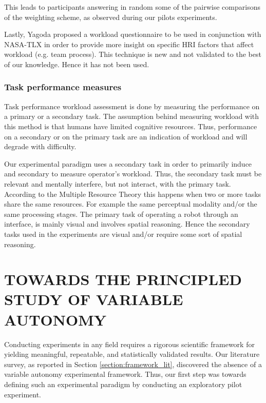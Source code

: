 \documentclass[a4paper,12pt,oneside,openright]{bhamthesis}
\begin{document}
This leads to participants answering in random some of the pairwise comparisons of the weighting scheme, as observed during our pilots experiments.

Lastly, Yagoda \citep{Yagoda2010} proposed a workload questionnaire to be used in conjunction with NASA-TLX in order to provide more insight on specific HRI factors that affect workload (e.g. team process). This technique is new and not validated to the best of our knowledge. Hence it has not been used. 

\subsection{Task performance measures}
Task performance workload assessment is done by measuring the performance on a primary or a secondary task. The assumption behind measuring workload with this method is that humans have limited cognitive resources. Thus, performance on a secondary or on the primary task are an indication of workload and will degrade with difficulty.

Our experimental paradigm uses a secondary task in order to primarily induce and secondary to measure operator's workload. Thus, the secondary task must be relevant and mentally interfere, but not interact, with the primary task. According to the Multiple Resource Theory \citep{Wickens2008,Wickens2002} this happens when two or more tasks share the same resources. For example the same perceptual modality and/or the same processing stages. The primary task of operating a robot through an interface, is mainly visual and involves spatial reasoning. Hence the secondary tasks used in the experiments are visual and/or require some sort of spatial reasoning. 


\chapter{TOWARDS THE PRINCIPLED STUDY OF VARIABLE AUTONOMY}\label{chapter3:towards}

Conducting experiments in any field requires a rigorous scientific framework for yielding meaningful, repeatable, and statistically validated results. Our literature survey, as reported in Section \ref{section:framework_lit}, discovered the absence of a variable autonomy experimental framework. Thus, our first step was towards defining such an experimental paradigm by conducting an exploratory pilot experiment.
\end{document}
